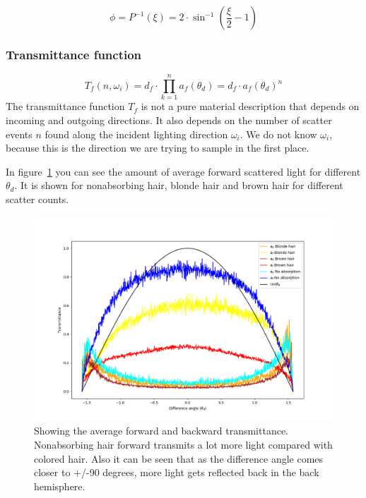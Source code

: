 \documentclass[12pt,a4paper,twoside]{article}
\begin{document}
\begin{equation}
\phi = P^{-1}(\xi) = 2 \cdot \sin^{-1} \left( \frac{\xi}{2} - 1\right)
\end{equation}

\subsubsection*{Transmittance function}
\begin{equation}
T_f(n, \omega_i) = d_f \cdot \prod_{k=1}^{n} a_f(\theta_d) = d_f \cdot a_f(\theta_d)^n
\end{equation}
The transmittance function $T_f$ is not a pure material description that depends on incoming and outgoing directions. It also depends on the number of scatter events $n$ found along the incident lighting direction $\omega_i$. We do not know $\omega_i$, because this is the direction we are trying to sample in the first place.

In figure~\ref{fig:average_ab_af} you can see the amount of average forward scattered light for different $\theta_d$. It is shown for nonabsorbing hair, blonde hair and brown hair for different scatter counts.

\begin{figure}
  \includegraphics[width=\linewidth]{average_forward_backward_scattering_attenuation.png}
  \caption{Showing the average forward and backward transmittance. Nonabsorbing hair forward transmits a lot more light compared with colored hair. Also it can be seen that as the difference angle comes closer to +/-90 degrees, more light gets reflected back in the back hemisphere.}
  \label{fig:average_ab_af}
\end{figure}
\end{document}

